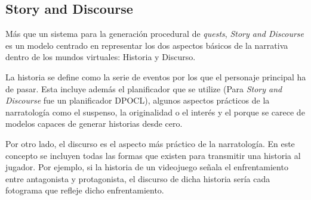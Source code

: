 \subsection{Story and Discourse}

Más que un sistema para la generación procedural de \textit{quests}, \textit{Story and Discourse} \cite{young2007story} es un modelo centrado en representar los dos aspectos básicos de la narrativa dentro de los mundos virtuales: Historia y Discurso. 

La historia se define como la serie de eventos por los que el personaje principal ha de pasar. Esta incluye además el planificador que se utilize (Para \textit{Story and Discourse} fue un planificador \ac{DPOCL}), algunos aspectos prácticos de la narratología como el suspenso, la originalidad o el interés y el porque se carece de modelos capaces de generar historias desde cero. 

Por otro lado, el discurso es el aspecto más práctico de la narratología. En este concepto se incluyen todas las formas que existen para transmitir una historia al jugador. Por ejemplo, si la historia de un videojuego señala el enfrentamiento entre antagonista y protagonista, el discurso de dicha historia sería cada fotograma que refleje dicho enfrentamiento. 






























